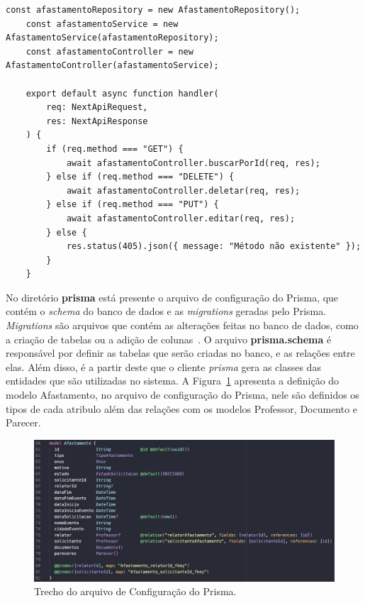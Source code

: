 \begin{lstlisting}[caption={Função de gerenciamento da rota afastamento/id},label={lst-controller}, float=htpb]
    const afastamentoRepository = new AfastamentoRepository();
    const afastamentoService = new AfastamentoService(afastamentoRepository);
    const afastamentoController = new AfastamentoController(afastamentoService);
    
    export default async function handler(
        req: NextApiRequest,
        res: NextApiResponse
    ) {
        if (req.method === "GET") {
            await afastamentoController.buscarPorId(req, res);
        } else if (req.method === "DELETE") {
            await afastamentoController.deletar(req, res);
        } else if (req.method === "PUT") {
            await afastamentoController.editar(req, res);
        } else {
            res.status(405).json({ message: "Método não existente" });
        }
    }
\end{lstlisting}

No diretório \textbf{prisma} está presente o arquivo de configuração do Prisma, que contém o \textit{schema} do banco de dados e as \textit{migrations}
geradas pelo Prisma. \textit{Migrations} são arquivos que contém as alterações feitas no banco de dados, como a criação de tabelas ou a adição de colunas~\cite{prisma:2020}.
O arquivo \textbf{prisma.schema} é responsável por definir as tabelas que serão criadas no banco, e as relações entre elas. Além disso, é a partir deste que 
o cliente \textit{prisma} gera as classes das entidades que são utilizadas no sistema.
A Figura~\ref{fig-prisma} apresenta a definição do modelo Afastamento, no arquivo de configuração do Prisma, nele são
definidos os tipos de cada atribulo além das relações com os modelos Professor, Documento e Parecer.

\begin{figure}[h!]
    \centering
    \includegraphics[width=\textwidth]{figuras/fig-model-prisma.png}
    \caption{Trecho do arquivo de Configuração do Prisma.}
    \label{fig-prisma}
\end{figure}

